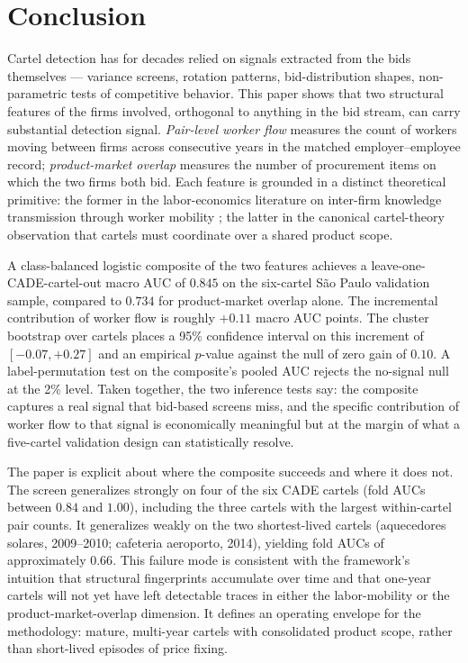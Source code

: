 \section{Conclusion}\label{sec:conclusion}

Cartel detection has for decades relied on signals extracted from the bids themselves --- variance screens, rotation patterns, bid-distribution shapes, non-parametric tests of competitive behavior. This paper shows that two structural features of the firms involved, orthogonal to anything in the bid stream, can carry substantial detection signal. \emph{Pair-level worker flow} measures the count of workers moving between firms across consecutive years in the matched employer--employee record; \emph{product-market overlap} measures the number of procurement items on which the two firms both bid. Each feature is grounded in a distinct theoretical primitive: the former in the labor-economics literature on inter-firm knowledge transmission through worker mobility \citep{stoyanov2012worker, jarosch2021learning, sorkin2018ranking}; the latter in the canonical cartel-theory observation \citep{stigler1964theory, green1984noncooperative} that cartels must coordinate over a shared product scope.

A class-balanced logistic composite of the two features achieves a leave-one-CADE-cartel-out macro AUC of $0.845$ on the six-cartel S\~{a}o Paulo validation sample, compared to $0.734$ for product-market overlap alone. The incremental contribution of worker flow is roughly $+0.11$ macro AUC points. The cluster bootstrap over cartels places a 95\% confidence interval on this increment of $[-0.07, +0.27]$ and an empirical $p$-value against the null of zero gain of $0.10$. A label-permutation test on the composite's pooled AUC rejects the no-signal null at the 2\% level. Taken together, the two inference tests say: the composite captures a real signal that bid-based screens miss, and the specific contribution of worker flow to that signal is economically meaningful but at the margin of what a five-cartel validation design can statistically resolve.

The paper is explicit about where the composite succeeds and where it does not. The screen generalizes strongly on four of the six CADE cartels (fold AUCs between $0.84$ and $1.00$), including the three cartels with the largest within-cartel pair counts. It generalizes weakly on the two shortest-lived cartels (aquecedores solares, 2009--2010; cafeteria aeroporto, 2014), yielding fold AUCs of approximately $0.66$. This failure mode is consistent with the framework's intuition that structural fingerprints accumulate over time and that one-year cartels will not yet have left detectable traces in either the labor-mobility or the product-market-overlap dimension. It defines an operating envelope for the methodology: mature, multi-year cartels with consolidated product scope, rather than short-lived episodes of price fixing.

